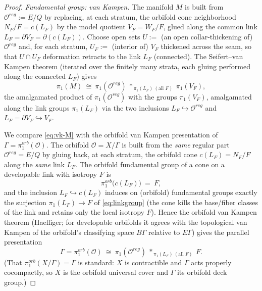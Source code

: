\documentclass[12pt]{article}
\theoremstyle{definition}
\begin{document}
\begin{proof}
\emph{Fundamental group: van Kampen.} The manifold $M$ is built from $\mathcal
O^{reg}:=E/Q$ by replacing, at each stratum, the orbifold cone neighborhood
$N_F/F=c(L_F)$ by the model quotient $V_F=W_F/F$, glued along the common link
$L_F=\partial V_F=\partial(c(L_F))$. Choose open sets
$U:=$ (an open collar-thickening of) $\mathcal O^{reg}$ and, for each stratum,
$U_F:=$ (interior of) $V_F$ thickened across the seam, so that $U\cap U_F$
deformation retracts to the link $L_F$ (connected). The Seifert--van Kampen
theorem (iterated over the finitely many strata, each gluing performed along the
connected $L_F$) gives
\begin{equation}\label{eq:vk-M}
   \pi_1(M)\ \cong\ \pi_1(\mathcal O^{reg})\ *_{\,\pi_1(L_F)\ (\text{all }F)}\
   \pi_1(V_F),
\end{equation}
the amalgamated product of $\pi_1(\mathcal O^{reg})$ with the groups $\pi_1(V_F)$,
amalgamated along the link groups $\pi_1(L_F)$ via the two inclusions
$L_F\hookrightarrow\mathcal O^{reg}$ and $L_F=\partial V_F\hookrightarrow V_F$.

We compare \eqref{eq:vk-M} with the orbifold van Kampen presentation of
$\Gamma=\pi_1^{orb}(\mathcal O)$. The orbifold $\mathcal O=X/\Gamma$ is built from
the \emph{same} regular part $\mathcal O^{reg}=E/Q$ by gluing back, at each
stratum, the orbifold cone $c(L_F)=N_F/F$ along the \emph{same} link $L_F$. The
orbifold fundamental group of a cone on a developable link with isotropy $F$ is
\[
   \pi_1^{orb}\big(c(L_F)\big)\ =\ F,
\]
and the inclusion $L_F\hookrightarrow c(L_F)$ induces on (orbifold) fundamental
groups exactly the surjection $\pi_1(L_F)\to F$ of \eqref{eq:linkgroup} (the cone
kills the base/fiber classes of the link and retains only the local isotropy $F$).
Hence the orbifold van Kampen theorem (Haefliger; for developable orbifolds it
agrees with the topological van Kampen of the orbifold's classifying space
$B\Gamma$ relative to $E\Gamma$) gives the parallel presentation
\begin{equation}\label{eq:vk-orb}
   \Gamma=\pi_1^{orb}(\mathcal O)\ \cong\ \pi_1(\mathcal O^{reg})\
   *_{\,\pi_1(L_F)\ (\text{all }F)}\ F .
\end{equation}
(That $\pi_1^{orb}(X/\Gamma)=\Gamma$ is standard: $X$ is contractible and
$\Gamma$ acts properly cocompactly, so $X$ is the orbifold universal cover and
$\Gamma$ its orbifold deck group.)


\end{proof}
\end{document}
